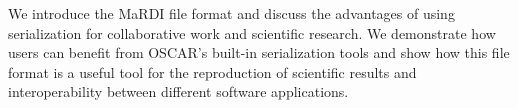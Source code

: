 

We introduce the MaRDI file format and discuss the advantages of using serialization for collaborative work and scientific research. We demonstrate how users can benefit from OSCAR's built-in serialization tools and show how this file format is a useful tool for the reproduction of scientific results and interoperability between different software applications.
